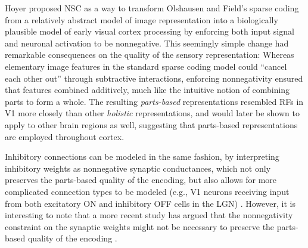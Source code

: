 Hoyer \citep{Hoyer2002,Hoyer2003} proposed \ac{NSC} as a way 
to transform Olshausen and Field's sparse coding 
from a relatively abstract model of image representation 
into a biologically plausible model of early visual cortex processing
by enforcing both input signal and neuronal activation to be nonnegative.
This seemingly simple change had remarkable consequences on the quality of the
sensory representation:
Whereas elementary image features in the standard sparse coding model could
``cancel each other out'' through subtractive interactions,
enforcing nonnegativity ensured that features combined additively,
much like the intuitive notion of combining parts to form a whole.
The resulting \emph{parts-based} representations resembled \acp{RF} in \ac{V1} more closely
than other \emph{holistic} representations,
and would later be shown to apply to other brain regions as well,
suggesting that parts-based representations are employed throughout cortex.

Inhibitory connections can be modeled in the same fashion,
by interpreting inhibitory weights as nonnegative synaptic conductances,
which not only
preserves the parts-based quality of the encoding,
but also allows for more complicated connection types to be modeled
(e.g., \ac{V1} neurons receiving input from both excitatory ON
and inhibitory OFF cells in the \ac{LGN})
\citep{Hoyer2003}.
However, it is interesting to note that a more recent study has argued
that the nonnegativity constraint on the
synaptic weights might not be necessary to preserve the parts-based quality of
the encoding \citep{Liu2017}.

